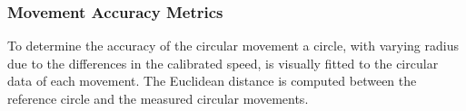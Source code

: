 \subsubsection{Movement Accuracy Metrics}

To determine the accuracy of the circular movement a circle, with varying radius due to the differences in the calibrated speed, is visually fitted to the circular data of each movement.
The Euclidean distance is computed between the reference circle and the measured circular movements.


\begin{table}[t]
	\centering
	\caption{The mean and standard deviation of the Euclidean distance from the fitted circle.}
	\label{tab:circular_results}
\end{table}

